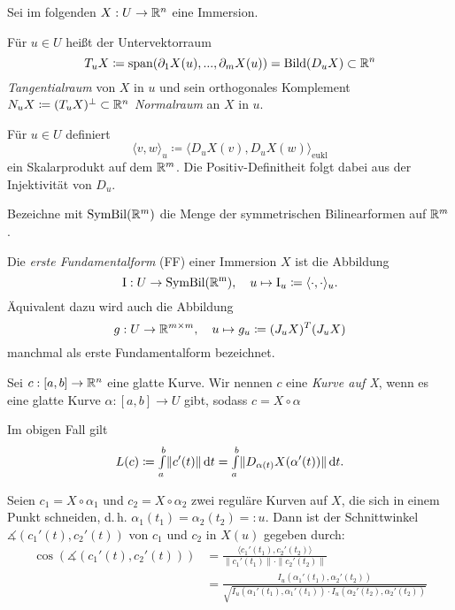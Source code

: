 \documentclass{cheat-sheet}
\newcommand{\Intabdt}[1]{\Int{a}{b}{#1}{t}}
\newcommand{\I}{\mathrm{I}}
\begin{document}
\begin{nota}
  Sei im folgenden $X : U \to \mathbb{R}^n$ eine Immersion.
\end{nota}

\begin{defn}
  Für $u \in U$ heißt der Untervektorraum
  \[ T_u X \coloneqq \mathrm{span}(\partial_1 X(u), ..., \partial_m X(u)) = \mathrm{Bild}(D_u X) \subset \mathbb{R}^n \]
  \emph{Tangentialraum} von $X$ in $u$ und sein orthogonales Komplement $N_u X \coloneqq (T_u X)^\perp \subset \mathbb{R}^n$ \emph{Normalraum} an $X$ in $u$.
\end{defn}

\begin{bem}
  Für $u \in U$ definiert
  \[ \langle v, w \rangle_u \coloneqq \langle D_u X(v), D_u X(w) \rangle_{\mathrm{eukl}} \]
  ein Skalarprodukt auf dem $\mathbb{R}^m$. Die Positiv-Definitheit folgt dabei aus der Injektivität von $D_u$.
\end{bem}

\begin{bem}
  Bezeichne mit $\mathrm{SymBil}(\mathbb{R}^m)$ die Menge der symmetrischen Bilinearformen auf $\mathbb{R}^m$.
\end{bem}

\begin{defn}
  Die \emph{erste Fundamentalform} (FF) einer Immersion $X$ ist die Abbildung
  \[ \I : U \to \mathrm{SymBil(\R^m)}, \quad u \mapsto \I_u \coloneqq \langle \cdot , \cdot \rangle_u. \]
  Äquivalent dazu wird auch die Abbildung
  \[ g : U \to \mathbb{R}^{m \times m}, \quad u \mapsto g_u \coloneqq (J_u X)^T (J_u X) \]
  manchmal als erste Fundamentalform bezeichnet.
\end{defn}

\begin{defn}
  Sei $c : [a, b] \to \mathbb{R}^n$ eine glatte Kurve. Wir nennen $c$ eine \emph{Kurve auf X}, wenn es eine glatte Kurve $\alpha : [a, b] \to U$ gibt, sodass $c = X \circ \alpha$
\end{defn}

\begin{bem}
  Im obigen Fall gilt
  \[ L(c) \coloneqq \Intabdt{\|c'(t)\|} = \Intabdt{\| D_{\alpha(t)} X(\alpha'(t)) \|}. \]
\end{bem}

\begin{bem}
  Seien $c_1 = X \circ \alpha_1$ und $c_2 = X \circ \alpha_2$ zwei reguläre Kurven auf $X$, die sich in einem Punkt schneiden, d.\,h. $\alpha_1(t_1) = \alpha_2(t_2) =: u$. Dann ist der Schnittwinkel $\measuredangle(c_1'(t), c_2'(t))$ von $c_1$ und $c_2$ in $X(u)$ gegeben durch:
  \begin{align*}
    \cos(\measuredangle(c_1'(t), c_2'(t))) &= \frac{\langle c_1'(t_1) , c_2'(t_2) \rangle}{\| c_1'(t_1) \| \cdot \| c_2'(t_2) \|} \\
    &= \frac{I_u(\alpha_1'(t_1), \alpha_2'(t_2))}{\sqrt{I_u(\alpha_1'(t_1), \alpha_1'(t_1)) \cdot I_u(\alpha_2'(t_2), \alpha_2'(t_2))}}
  \end{align*}
\end{bem}
\end{document}
